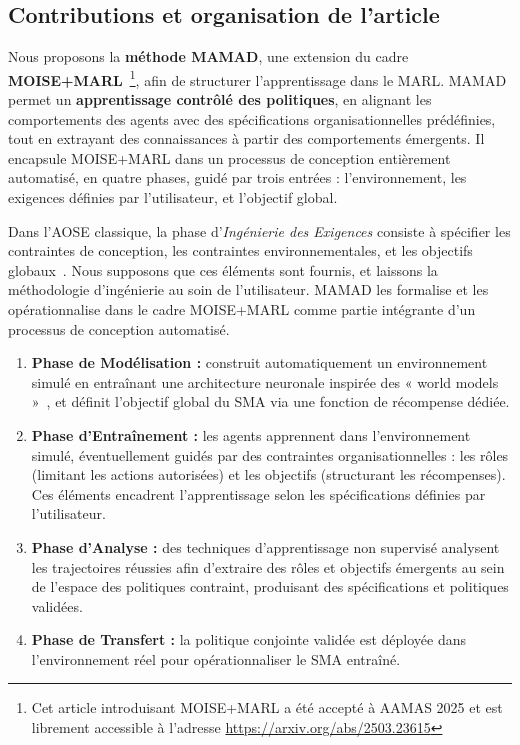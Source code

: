 \documentclass[pdflatex,sn-mathphys-num]{sn-jnl}%
\theoremstyle{thmstyleone}%
\theoremstyle{thmstyletwo}%
\theoremstyle{thmstylethree}%
\begin{document}
\subsection{Contributions et organisation de l’article}

Nous proposons la \textbf{méthode MAMAD}, une extension du cadre \textbf{MOISE+MARL}~\cite{soule2025moisemarl}\footnote{Cet article introduisant MOISE+MARL a été accepté à AAMAS 2025 et est librement accessible à l’adresse \url{https://arxiv.org/abs/2503.23615}}, afin de structurer l’apprentissage dans le MARL. MAMAD permet un \textbf{apprentissage contrôlé des politiques}, en alignant les comportements des agents avec des spécifications organisationnelles prédéfinies, tout en extrayant des connaissances à partir des comportements émergents. Il encapsule MOISE+MARL dans un processus de conception entièrement automatisé, en quatre phases, guidé par trois entrées : l’environnement, les exigences définies par l’utilisateur, et l’objectif global.

Dans l’AOSE classique, la phase d’\textit{Ingénierie des Exigences} consiste à spécifier les contraintes de conception, les contraintes environnementales, et les objectifs globaux~\cite{Pavon2003, Bernon2005}. Nous supposons que ces éléments sont fournis, et laissons la méthodologie d’ingénierie au soin de l’utilisateur. MAMAD les formalise et les opérationnalise dans le cadre MOISE+MARL comme partie intégrante d’un processus de conception automatisé.

\begin{enumerate}
    \item \textbf{Phase de Modélisation :} construit automatiquement un environnement simulé en entraînant une architecture neuronale inspirée des « world models »~\cite{Ha2018}, et définit l’objectif global du SMA via une fonction de récompense dédiée.
    \item \textbf{Phase d’Entraînement :} les agents apprennent dans l’environnement simulé, éventuellement guidés par des contraintes organisationnelles : les rôles (limitant les actions autorisées) et les objectifs (structurant les récompenses). Ces éléments encadrent l’apprentissage selon les spécifications définies par l’utilisateur.
    \item \textbf{Phase d’Analyse :} des techniques d’apprentissage non supervisé analysent les trajectoires réussies afin d’extraire des rôles et objectifs émergents au sein de l’espace des politiques contraint, produisant des spécifications et politiques validées.
    \item \textbf{Phase de Transfert :} la politique conjointe validée est déployée dans l’environnement réel pour opérationnaliser le SMA entraîné.
\end{enumerate}
\end{document}
